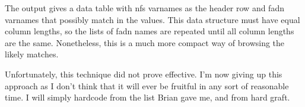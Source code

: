 \documentclass{article}\usepackage[]{graphicx}\usepackage[]{color}
\begin{document}
\begin{flushleft}
The output gives a data table with nfs varnames as the header row and fadn varnames that possibly match in the values. This data structure must have equal column lengths, so the lists of fadn names are repeated until all column lengths are the same. Nonetheless, this is a much more compact way of browsing the likely matches. 

Unfortunately, this technique did not prove effective. I'm now giving up this approach as I don't think that it will ever be fruitful in any sort of reasonable time. I will simply hardcode from the list Brian gave me, and from hard graft.

\end{flushleft}
\end{document}
